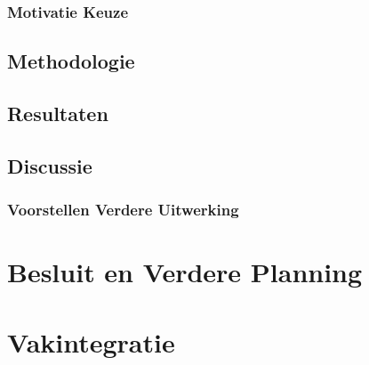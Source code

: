 \documentclass[a4paper,11pt]{article}
\begin{document}
	\subsubsection{Motivatie Keuze}
	\subsection{Methodologie}
	\subsection{Resultaten}
	\subsection{Discussie}
	\subsubsection{Voorstellen Verdere Uitwerking}
	
	
	
	\section{Besluit en Verdere Planning}
	
	
	
	\section{Vakintegratie}	%
	
	
	
	
	
	
	
	\begin{thebibliography}{10}	%
		
	\end{thebibliography}
	\listoffigures		%
	\listoftables		%
\end{document}
